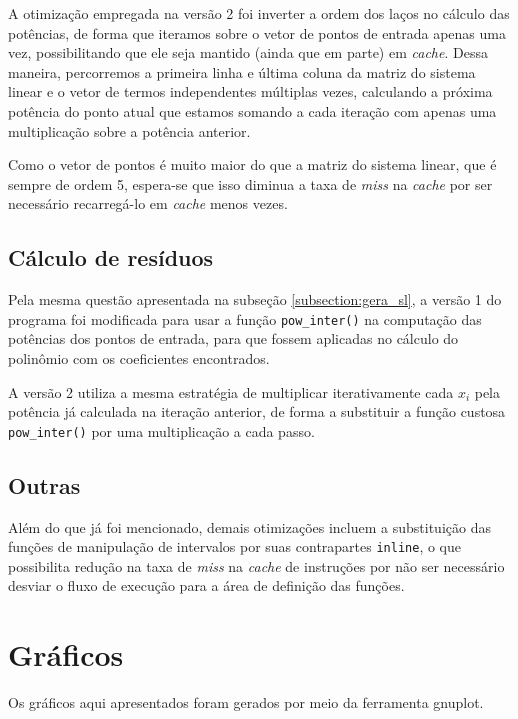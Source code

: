 \documentclass[a4paper, 11pt]{article}
\begin{document}
A otimização empregada na versão 2 foi inverter a ordem dos laços no cálculo
das potências, de forma que iteramos sobre o vetor de pontos de entrada apenas
uma vez, possibilitando que ele seja mantido (ainda que em parte) em
\textit{cache}. Dessa maneira, percorremos a primeira linha e última coluna da
matriz do sistema linear e o vetor de termos independentes múltiplas vezes,
calculando a próxima potência do ponto atual que estamos somando a cada
iteração com apenas uma multiplicação sobre a potência anterior.

Como o vetor de pontos é muito maior do que a matriz do sistema linear, que é
sempre de ordem 5, espera-se que isso diminua a taxa de \textit{miss} na
\textit{cache} por ser necessário recarregá-lo em \textit{cache} menos vezes.

\subsection{Cálculo de resíduos}
Pela mesma questão apresentada na subseção \ref{subsection:gera_sl}, a versão
1 do programa foi modificada para usar a função \texttt{pow\_inter()} na
computação das potências dos pontos de entrada, para que fossem aplicadas no
cálculo do polinômio com os coeficientes encontrados.

A versão 2 utiliza a mesma estratégia de multiplicar iterativamente cada $x_i$
pela potência já calculada na iteração anterior, de forma a substituir a
função custosa \texttt{pow\_inter()} por uma multiplicação a cada passo.

\subsection{Outras}
Além do que já foi mencionado, demais otimizações incluem a substituição das
funções de manipulação de intervalos por suas contrapartes \texttt{inline}, o
que possibilita redução na taxa de \textit{miss} na \textit{cache} de
instruções por não ser necessário desviar o fluxo de execução para a área de
definição das funções.

\section{Gráficos}
Os gráficos aqui apresentados foram gerados por meio da ferramenta gnuplot.
\def\path{../resultados/graficos}

\renewcommand{\thefigure}{\arabic{subsection}.\arabic{figure}}
\end{document}
